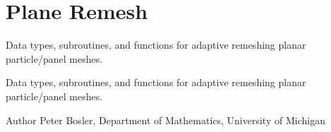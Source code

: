 \hypertarget{group__PlaneRemesh}{\section{Plane Remesh}
\label{group__PlaneRemesh}
}


Data types, subroutines, and functions for adaptive remeshing planar particle/panel meshes.  


Data types, subroutines, and functions for adaptive remeshing planar particle/panel meshes. 

\begin{DoxyAuthor}{Author}
Peter Bosler, Department of Mathematics, University of Michigan 
\end{DoxyAuthor}
